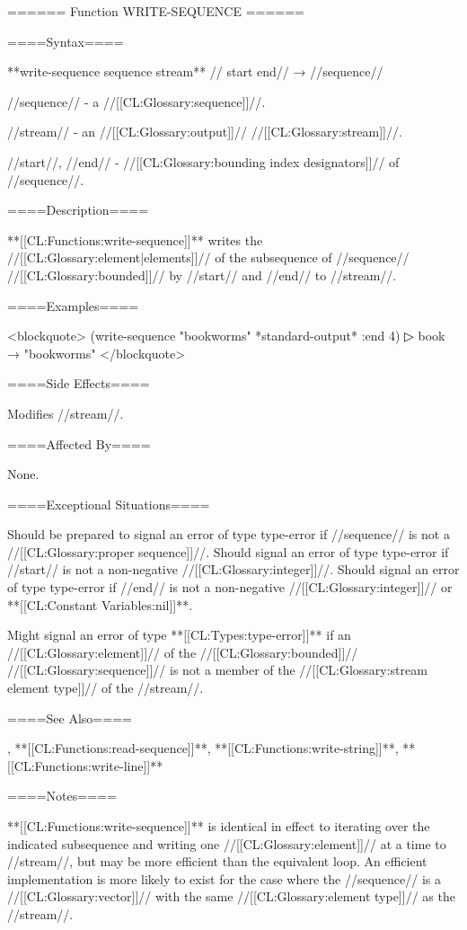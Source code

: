 ====== Function WRITE-SEQUENCE ======

====Syntax====

**{write-sequence} {sequence stream** //\key} start end// → //sequence//

//sequence// - a //[[CL:Glossary:sequence]]//.

//stream// - an //[[CL:Glossary:output]]// //[[CL:Glossary:stream]]//.

//start//, //end// - //[[CL:Glossary:bounding index designators]]// of //sequence//. 

====Description====

**[[CL:Functions:write-sequence]]** writes the //[[CL:Glossary:element|elements]]// of the subsequence of //sequence// //[[CL:Glossary:bounded]]// by //start// and //end// to //stream//.

====Examples====

<blockquote> (write-sequence "bookworms" *standard-output* :end 4)
▷ book → "bookworms" </blockquote>

====Side Effects====

Modifies //stream//.

====Affected By====

None.

====Exceptional Situations====

Should be prepared to signal an error of type type-error if //sequence// is not a //[[CL:Glossary:proper sequence]]//. Should signal an error of type type-error if //start// is not a non-negative //[[CL:Glossary:integer]]//. Should signal an error of type type-error if //end// is not a non-negative //[[CL:Glossary:integer]]// or **[[CL:Constant Variables:nil]]**.

Might signal an error of type **[[CL:Types:type-error]]** if an //[[CL:Glossary:element]]// of the //[[CL:Glossary:bounded]]// //[[CL:Glossary:sequence]]// is not a member of the //[[CL:Glossary:stream element type]]// of the //stream//.

====See Also====

{\secref\ConstantModification}, **[[CL:Functions:read-sequence]]**, **[[CL:Functions:write-string]]**, **[[CL:Functions:write-line]]**

====Notes====

**[[CL:Functions:write-sequence]]** is identical in effect to iterating over the indicated subsequence and writing one //[[CL:Glossary:element]]// at a time to //stream//, but may be more efficient than the equivalent loop. An efficient implementation is more likely to exist for the case where the //sequence// is a //[[CL:Glossary:vector]]// with the same //[[CL:Glossary:element type]]// as the //stream//.

